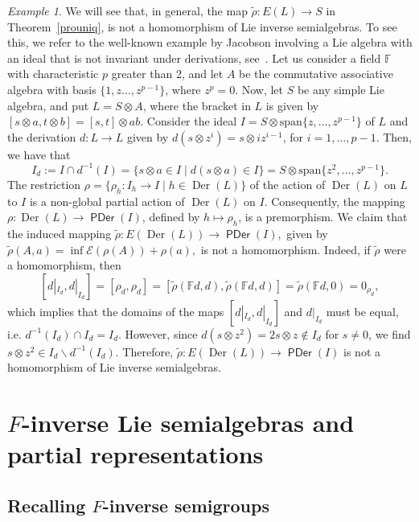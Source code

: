 \documentclass{amsart}
\newcommand{\E}{\mathcal{E}}
\newcommand{\F}{\mathbb{F}}
\newcommand{\0}{{\vartheta}}
\theoremstyle{definition}
\theoremstyle{remark}
\newtheorem{ex}[thm]{Example}
\numberwithin{equation}{section}
\newtheorem*{Theorem A}{\textbf{Theorem A}}
\newtheorem*{Corollary E}{\textbf{Corollary E}}
\newtheorem*{Corollary F}{\textbf{Corollary F}}
\newtheorem*{Theorem B}{\textbf{Theorem B}}
\newtheorem*{Theorem C}{\textbf{Theorem C}}
\newtheorem*{Theorem D}{\textbf{Theorem B}}
\newtheorem*{p a}{\textbf{Proof of  Theorem A}}
\newtheorem*{p b}{\textbf{Proof of Theorem B}}
\newtheorem*{p c}{\textbf{Proof of  Theorem C}}
\newtheorem*{p d}{\textbf{Proof of  Theorem D}}
\DeclareMathOperator{\der}{Der}
\DeclareMathOperator{\pde}{\textsf{PDer}}
\begin{document}
\begin{ex}
We will see that, in general, the map 
 $\widetilde{\rho}:E(L)\to S$ in Theorem~\ref{prouniq}, is not a homomorphism of Lie inverse semialgebras.
To see this, we refer to the well-known example by Jacobson involving a Lie algebra with an ideal that is not invariant under derivations, see~\cite[p. 75]{Ja}. Let us consider a field $\F$ with characteristic  $p$ greater than 2, and let $A$ be the commutative associative algebra  with basis  $\{1,z\ldots,z^{p-1}\}$, where $z^p=0$. Now, let $S$ be any simple Lie algebra, and put $L=S\otimes A$, where the bracket in $L$ is given by $[s\otimes a,t\otimes b]=[s,t]\otimes ab.$ Consider the ideal $I=S\otimes
 \text{span}\{z,\ldots,z^{p-1}\}$ of $L$ and the derivation $d:L\to L$ given by $d(s\otimes z^i)= s \otimes iz^{i-1}$, for $i=1,\ldots,p-1$. Then, we have that 
$$I_d:=I\cap  d^{-1} (I) =\{s\otimes a\in I\mid d(s\otimes a)\in I\}=S\otimes  \text{span}\{z^2,\ldots,z^{p-1}\}.$$
The restriction $\rho=\{\rho_h: I_h\to I\mid h\in \der(L)\}$ of the action of $\der(L)$ on $L$ to $I$ is a non-global partial action of $\der(L)$ on $I$. Consequently, the mapping $\rho: \der(L)\to \pde(I)$, defined by $h\mapsto \rho_h$, is a premorphism. We claim that the induced mapping   $\widetilde\rho: E(\der(L))\to \pde(I),$ given by $ \widetilde\rho(A,a)=\inf\E(\rho(A))+\rho(a),$  is not a homomorphism. Indeed, if $\widetilde\rho$ were a homomorphism, then 
$$[d|_{I_d},d|_{I_d}]=[\rho_d,\rho_d]=[\widetilde\rho(\F d,d),\widetilde\rho(\F d,d)]=\widetilde\rho(\F d,0) =0_{\rho_d},$$
which implies that the domains of the maps $[d|_{I_d},d|_{I_d}]$ and $d|_{I_d}$ must be equal, i.e. $d^{-1}(I_d)\cap I_d=I_d$. However, since  $d(s\otimes z^2)= 2s\otimes  z\notin I_d$ for $s\neq 0$, we find $s\otimes z^2\in I_d\backslash d^{-1}(I_d).$ Therefore, $\widetilde\rho:E(\der(L))\to \pde(I)$ is not a homomorphism of Lie inverse semialgebras.
\end{ex}

\section{  $F$-inverse Lie semialgebras and partial representations}\label{s: F-inverse}

\subsection{Recalling $F$-inverse semigroups}
\end{document}
